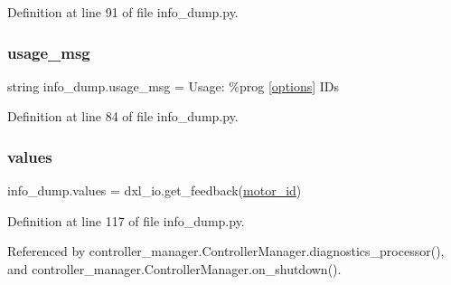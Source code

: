 Definition at line 91 of file info\+\_\+dump.\+py.

\mbox{\label{namespaceinfo__dump_a90a3cf17b0c24ded2ef387fa67ef7f1e}} 
\subsubsection{\texorpdfstring{usage\+\_\+msg}{usage\_msg}}
{\footnotesize\ttfamily string info\+\_\+dump.\+usage\+\_\+msg = \textquotesingle{}Usage\+: \%prog \mbox{[}\hyperlink{namespaceinfo__dump_a7d6b1021261929bba75323767de00e7c}{options}\mbox{]} I\+Ds\textquotesingle{}}



Definition at line 84 of file info\+\_\+dump.\+py.

\mbox{\label{namespaceinfo__dump_a519d64383e606d3ddaff0c01f233d087}} 
\subsubsection{\texorpdfstring{values}{values}}
{\footnotesize\ttfamily info\+\_\+dump.\+values = dxl\+\_\+io.\+get\+\_\+feedback(\hyperlink{namespaceinfo__dump_ab8304b7617ad78e51a49ee40b5f2f3fc}{motor\+\_\+id})}



Definition at line 117 of file info\+\_\+dump.\+py.



Referenced by controller\+\_\+manager.\+Controller\+Manager.\+diagnostics\+\_\+processor(), and controller\+\_\+manager.\+Controller\+Manager.\+on\+\_\+shutdown().

